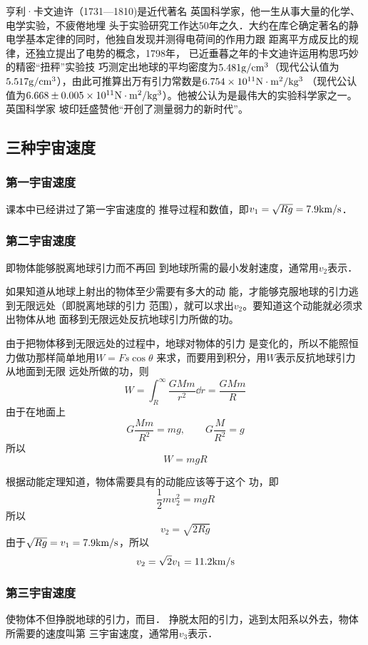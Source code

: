 亨利·卡文迪许（1731—1810)是近代著名
英国科学家，他一生从事大量的化学、电学实验，不疲倦地埋
头于实验研究工作达50年之久．大约在库仑确定著名的静
电学基本定律的同时，他独自发现并测得电荷间的作用力跟
距离平方成反比的规律，还独立提出了电势的概念，1798年，
已近垂暮之年的卡文迪许运用构思巧妙的精密“扭秤”实验技
巧测定出地球的平均密度为$5.481{\rm g/cm^3}$（现代公认值为
$5.517{\rm g/cm^3}$），由此可推算出万有引力常数是$6.754\times10^{11}{\rm N\cdot m^2/kg^3}$
（现代公认值为$6.668\pm 0.005\times10^{11}{\rm N\cdot m^2/kg^3}$）。他被公认为是最伟大的实验科学家之一。英国科学家
坡印廷盛赞他“开创了测量弱力的新时代”。

\subsection{三种宇宙速度}


\subsubsection{第一宇宙速度} 课本中已经讲过了第一宇宙速度的
推导过程和数值，即$v_1=\sqrt{Rg}=7.9{\rm km/s}$．

\subsubsection{第二宇宙速度} 即物体能够脱离地球引力而不再回
到地球所需的最小发射速度，通常用$v_2$表示．

如果知道从地球上射出的物体至少需要有多大的动
能，才能够克服地球的引力逃到无限远处（即脱离地球的引力
范围），就可以求出$v_2$。要知道这个动能就必须求出物体从地
面移到无限远处反抗地球引力所做的功。

由于把物体移到无限远处的过程中，地球对物体的引力
是变化的，所以不能照恒力做功那样简单地用$W=Fs\cos\theta$
来求，而要用到积分，用$W$表示反抗地球引力从地面到无限
远处所做的功，则
\[W=\int^{\infty}_R \frac{GMm}{r^2}\dd r=\frac{GMm}{R} \]
由于在地面上
\[G\frac{Mm}{R^2}=mg,\qquad G\frac{M}{R^2}=g\]
所以
\[W=mgR\]

根据动能定理知道，物体需要具有的动能应该等于这个
功，即
\[\frac{1}{2}mv^2_2=mgR\]
所以
\[v_2=\sqrt{2Rg}\]
由于$\sqrt{Rg}=v_1=7.9{\rm km/s}$，所以
\[v_2=\sqrt{2}v_1=11.2{\rm km/s}\]

\subsubsection{第三宇宙速度}

使物体不但挣脱地球的引力，而目．
挣脱太阳的引力，逃到太阳系以外去，物体所需要的速度叫第
三宇宙速度，通常用$v_3$表示．

